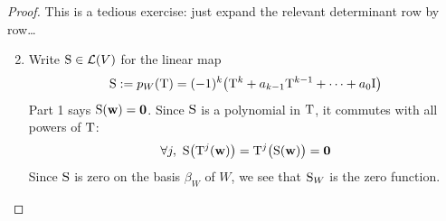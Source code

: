 \begin{proof}
	\exstart This is a tedious exercise: just expand the relevant determinant row by row\ldots
	\begin{enumerate}\setcounter{enumi}{1}
		
	  \item Write $\mathrm{S}\in\mathcal{L}(V)$ for the linear map
		\[
			\mathrm{S}:=p_W(\mathrm{T})=(-1)^k\bigl(\mathrm{T}^k+a_{k-1}\mathrm{T}^{k-1}+\cdots+a_0\mathrm{I}\bigr)
		\]
		Part 1 says $\mathrm{S}({\mathbf{w}})=\mathbf{0}$. Since $\mathrm{S}$ is a polynomial in $\mathrm{T}$, it commutes with all powers of $\mathrm{T}$:
		\[
			\forall j,\ \mathrm{S}\big(\mathrm{T}^j({\mathbf{w}})\big) =\mathrm{T}^j\big(\mathrm{S}({\mathbf{w}})\big) =\mathbf{0}
		\]
		Since $\mathrm{S}$ is zero on the basis $\beta_W$ of $W$, we see that $\mathrm{S}_{W}$ is the zero function.\qedhere
	\end{enumerate}
\end{proof}


